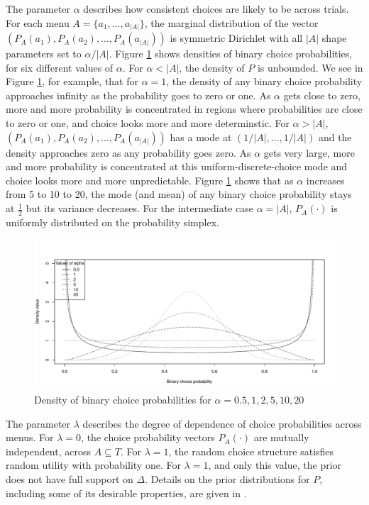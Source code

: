 \documentclass[11pt,letter]{article}
\newcommand{\menu}{menu}
\newcommand{\menus}{menus}
\begin{document}
The parameter $\alpha$ describes how consistent choices are likely to be across trials.
For each \menu{} $A = \{a_1,\ldots,a_{|A|}\}$, the marginal distribution of the vector $(P_A(a_1), P_A(a_2), \ldots, P_A(a_{|A|}))$ is symmetric Dirichlet with all $|A|$ shape parameters set to $\alpha / |A|$.
Figure \ref{f:bcp} shows densities of binary choice probabilities, for six different values of $\alpha$.
For $\alpha < |A|$, the density of $P$ is unbounded.
We see in Figure \ref{f:bcp}, for example, that for $\alpha = 1$, the density of any binary choice probability approaches infinity as the probability goes to zero or one.
As $\alpha$ gets close to zero, more and more probability is concentrated in regions where probabilities are close to zero or one, and choice looks more and more determinstic.
For $\alpha > |A|$, $(P_A(a_1), P_A(a_2), \ldots, P_A(a_{|A|}))$ has a mode at $(1/|A|, \ldots, 1/|A|)$ and the density approaches zero as any probability goes zero.
As $\alpha$ gets very large, more and more probability is concentrated at this uniform-discrete-choice mode and choice looks more and more unpredictable.
Figure \ref{f:bcp} shows that as $\alpha$ increases from 5 to 10 to 20, the mode (and mean) of any binary choice probability stays at $\tfrac{1}{2}$ but its variance decreases.
For the intermediate case $\alpha = |A|$, $P_A(\cdot)$ is uniformly distributed on the probability simplex.

\begin{figure}
	\begin{center}
	\includegraphics[width=15cm]{bcp.pdf}
	\caption{Density of binary choice probabilities for $\alpha = 0.5, 1, 2, 5, 10, 20$}\label{f:bcp}
	\end{center}
\end{figure}

The parameter $\lambda$ describes the degree of dependence of choice probabilities across \menus{}.
For $\lambda = 0$, the choice probability vectors $P_A(\cdot)$ are mutually independent, across $A \subseteq T$.
For $\lambda = 1$, the random choice structure satisfies random utility with probability one.
For $\lambda = 1$, and only this value, the prior does not have full support on $\Delta$.
Details on the prior distributions for $P$, including some of its desirable properties, are given in .
\end{document}
